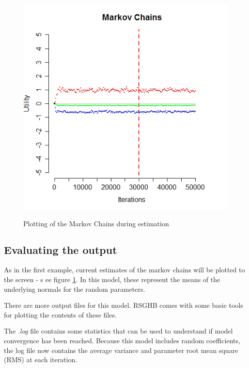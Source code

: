\documentclass{article}\usepackage{graphicx, color}
\begin{document}
\begin{figure}
\caption{Plotting of the Markov Chains during estimation}
\includegraphics[scale=0.50]{MNL_markovChains2.png}
\label{MarkovChain2}
\end{figure}


\subsection*{Evaluating the output}

As in the first example, current estimates of the markov chains will be plotted to the screen - s ee figure \ref{MarkovChain2}. In this model, these represent the means of the underlying normals for the random parameters.

There are more output files for this model. RSGHB comes with some basic tools for plotting the contents of these files.

The \emph{.log} file contains some statistics that can be used to understand if model convergence has been reached. Because this model includes random coefficients, the log file now contains the average variance and parameter root mean square (RMS) at each iteration.
\end{document}
